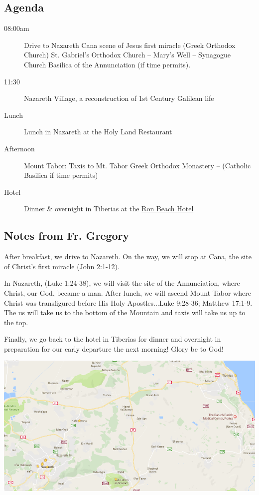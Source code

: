 \documentclass[letterpaper]{report}
\begin{document}
\subsection{Agenda}
\begin{description}
	\item[08:00am] Drive to Nazareth Cana
	  \subitem scene of Jesus first miracle (Greek Orthodox Church)
	  \subitem St. Gabriel’s Orthodox Church – Mary’s Well – Synagogue Church 
	  \subitem Basilica of the Annunciation (if time permits).
	\item[11:30] Nazareth Village,
	    a reconstruction of 1st Century Galilean life
	\item[Lunch] Lunch in Nazareth at the Holy Land Restaurant
	\item[Afternoon] Mount Tabor: Taxis to Mt. Tabor 
	    \subitem Greek Orthodox Monastery – (Catholic Basilica if time permits)
	\item[Hotel] Dinner \& overnight in Tiberias at the   
	  \href{http://www.ronbeachhotel.com/}{Ron Beach Hotel}
\end{description}

\subsection{Notes from Fr. Gregory}
After breakfast, we drive to Nazareth.
On the way, we will stop at Cana, the site of Christ's first miracle
(John 2:1-12).

In Nazareth, (Luke 1:24-38), we will visit the site of the Annunciation,
where Christ, our God, became a man.
After lunch, we will ascend Mount Tabor where Christ was transfigured before
His Holy Apostles...Luke 9:28-36; Matthew 17:1-9. 
The us will take us to the bottom of the Mountain and taxis will take us up to
the top.

Finally, we go back to the hotel in Tiberias for dinner and overnight in
preparation for our early departure the next morning! Glory be to God!

\includegraphics[width=\textwidth]{TiberiasCanaNazarethTabor}
\end{document}
